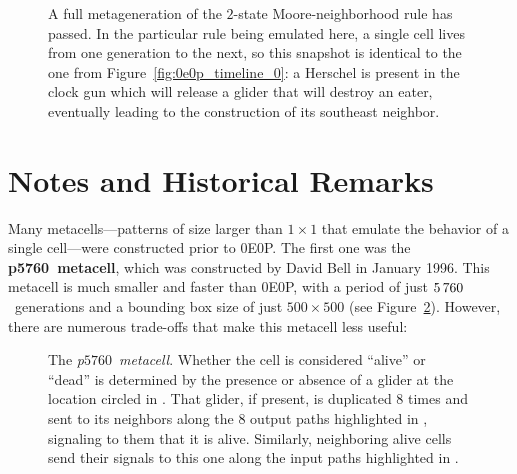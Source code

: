 \begin{figure}[!htb]
	\centering
	\caption{A full metageneration of the $2$-state Moore-neighborhood rule has passed. In the particular rule being emulated here, a single cell lives from one generation to the next, so this snapshot is identical to the one from Figure~\ref{fig:0e0p_timeline_0}: a Herschel is present in the clock gun which will release a glider that will destroy an eater, eventually leading to the construction of its southeast neighbor.}
	\label{fig:0e0p_timeline_68719476736}
\end{figure}


\section{Notes and Historical Remarks}\label{sec:0e0p_history}

Many metacells---patterns of size larger than $1 \times 1$ that emulate the behavior of a single cell---were constructed prior to 0E0P. The first one was the \textbf{p5760~metacell}, which was constructed by David Bell in January 1996. This metacell is much smaller and faster than 0E0P, with a period of just $5{\,}760$~generations and a bounding box size of just $500 \times 500$ (see Figure~\ref{fig:p5760_metacell}). However, there are numerous trade-offs that make this metacell less useful:\smallskip

\begin{figure}[!htb]
	\centering
	\caption{The \emph{p$5760$~metacell}. Whether the cell is considered ``alive'' or ``dead'' is determined by the presence or absence of a glider at the location circled in . That glider, if present, is duplicated $8$ times and sent to its neighbors along the $8$ output paths highlighted in , signaling to them that it is alive. Similarly, neighboring alive cells send their signals to this one along the input paths highlighted in .}\label{fig:p5760_metacell}
\end{figure}

